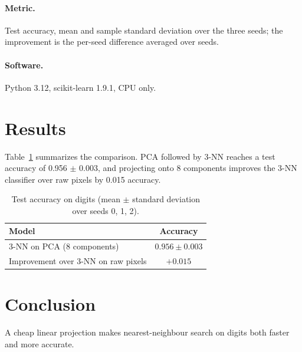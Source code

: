 \documentclass[11pt]{article}
\begin{document}
\paragraph{Metric.} Test accuracy, mean and sample standard deviation over the three seeds; the
improvement is the per-seed difference averaged over seeds.
\paragraph{Software.} Python 3.12, scikit-learn 1.9.1, CPU only.

\section{Results}
Table~\ref{tab:digits-knn} summarizes the comparison. PCA followed by 3-NN reaches a test
accuracy of 0.956 $\pm$ 0.003, and projecting onto 8 components improves the 3-NN classifier
over raw pixels by 0.015 accuracy.

\begin{table}[t]
\centering
\caption{Test accuracy on digits (mean $\pm$ standard deviation over seeds 0, 1, 2).}
\label{tab:digits-knn}
\begin{tabular}{lc}
\toprule
Model & Accuracy \\
\midrule
3-NN on PCA (8 components) & $0.956 \pm 0.003$ \\
\midrule
Improvement over 3-NN on raw pixels & $+0.015$ \\
\bottomrule
\end{tabular}
\end{table}

\section{Conclusion}
A cheap linear projection makes nearest-neighbour search on digits both faster and more accurate.
\end{document}
